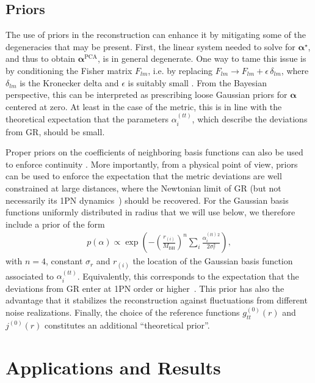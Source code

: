 \documentclass[%
nofootinbib,
 amsmath,amssymb,
 aps,
floatfix,
twocolumn
]{revtex4-2}
\begin{document}
\subsection{Priors}\label{methods_priors}

The use of priors in the reconstruction  can enhance it by mitigating some of the degeneracies that may be present. First, the linear system needed to solve for \(\boldsymbol{\alpha}^\star\), and thus  to obtain \(\boldsymbol{\alpha}^\text{PCA}\), is in general degenerate. One way to tame this issue is by conditioning the Fisher matrix \(F_{lm}\), i.e. by replacing \(F_{lm} \to F_{lm} + \epsilon \, \delta_{lm}\), where \(\delta_{lm}\) is the Kronecker delta and \(\epsilon\) is suitably small \cite{Pieroni:2020rob}. From the Bayesian perspective, this can be interpreted as prescribing loose Gaussian priors for \(\boldsymbol{\alpha}\) centered at zero. At least in the case of the metric, this is in line with the theoretical expectation that the parameters \(\alpha_{i}^{(tt)}\), which describe the deviations from GR, should be small.

Proper priors on the coefficients of neighboring basis functions can also be used to enforce continuity \cite{Silva:2017uqg}. More importantly, from a physical point of view, priors can be used to enforce the expectation that the metric deviations are well constrained at large distances, where the Newtonian limit of GR (but not necessarily its 1PN dynamics~\cite{Volkel:2020xlc}) should be recovered. For the Gaussian basis functions uniformly distributed in radius that we will use below, we therefore include a prior of the form
%
\begin{align}\label{eq: prior_large_distance}
p(\alpha) \propto \exp \left(-\left(\frac{r_{(i)}}{M_\text{BH}}\right)^n\sum_{i }^{}\frac{\alpha_{i}^{(tt)\,2}}{2\sigma^2_r}\right),
\end{align}
%
with \(n = 4\), constant \(\sigma_r\) and \(r_{(i)}\) the location of the Gaussian basis function associated to \(\alpha_i^{(tt)}\). Equivalently, this corresponds to the expectation that the deviations from GR enter at 1PN order or higher~\cite{Volkel:2020xlc}.
%
%
This prior has also the advantage that it stabilizes the reconstruction against fluctuations from different noise realizations. 
%
Finally, the choice of the reference functions \(g_{tt}^{(0)}(r)\) and \(j^{(0)}(r)\) constitutes an additional ``theoretical prior''. 
%

\section{Applications and Results}\label{applications_results}
\end{document}
